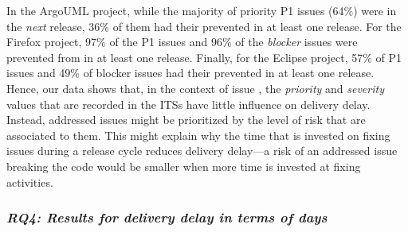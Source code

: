 In the ArgoUML project, while the majority of priority P1 issues (64\%) were
\DIFdelbegin {}\DIFdelend \DIFaddbegin {}\DIFaddend in the \textit{next} release, 36\% of them had their \DIFdelbegin {}\DIFdelend \DIFaddbegin {}\DIFaddend prevented in at least one release. For the Firefox project, 97\% of the P1
issues and 96\% of the \textit{blocker} issues were prevented from \DIFdelbegin {}\DIFdelend \DIFaddbegin {}\DIFaddend in at least one release. Finally, for the Eclipse project, 57\% of P1 issues and
49\% of blocker issues had their \DIFdelbegin {}\DIFdelend \DIFaddbegin {}\DIFaddend prevented in at least one release.
Hence, our data shows that, in the context of issue \DIFdelbegin {}\DIFdelend \DIFaddbegin {}\DIFaddend , the
\textit{priority} and \textit{severity} values that are recorded in the ITSs
have little influence on delivery delay. Instead, addressed issues might be
prioritized by the level of risk that are associated to them.\DIFdelbegin %
\DIFdelend \DIFaddbegin {} \DIFaddend This might explain
why the time that is invested on fixing issues during a release cycle reduces
delivery delay---a risk of an addressed issue breaking the code would be smaller
when more time is invested at fixing activities. 


\subsubsection*{\textbf{\textit{RQ4: Results for delivery delay in terms of days}}}

